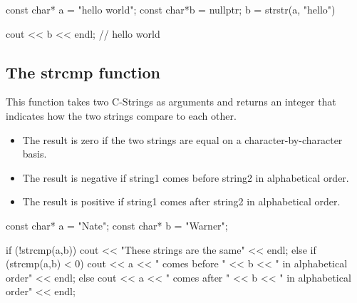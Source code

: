 \documentclass{report}
\begin{document}
    \begin{cppcode}
const char* a = "hello world";
const char*b = nullptr;
b = strstr(a, "hello")

cout << b << endl; // hello world
    \end{cppcode}
    
    \bigbreak \noindent 
    \bigbreak \noindent 

    \pagebreak
    \subsection{The strcmp function}
    \bigbreak \noindent 
    This function takes two C-Strings as arguments and returns an integer that indicates how the two strings compare to each other. 
    \begin{itemize}
        \item The result is zero if the two strings are equal on a character-by-character basis.
        \item The result is negative if string1 comes before string2 in alphabetical order.
        \item The result is positive if string1 comes after string2 in alphabetical order.
    \end{itemize}
    \bigbreak \noindent 
    
    \begin{cppcode}
const char* a = "Nate";
const char* b = "Warner";

if (!strcmp(a,b)) {
    cout << "These strings are the same" << endl;
} else if (strcmp(a,b) < 0) {
    cout << a << " comes before " << b << " in alphabetical order" << endl;
} else {
    cout << a << " comes after " << b << " in alphabetical order" << endl;
}
    \end{cppcode}
    

    \bigbreak \noindent 
\end{document}
